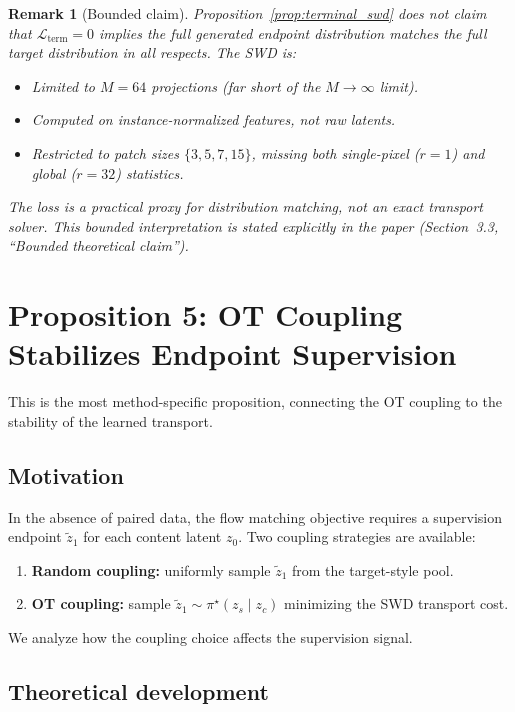 \documentclass[letterpaper]{article}
\newtheorem{remark}[proposition]{Remark}
\newcommand{\cL}{\mathcal{L}}
\begin{document}
\begin{remark}[Bounded claim]
Proposition~\ref{prop:terminal_swd} does not claim that $\cL_{\text{term}}=0$
implies the full generated endpoint distribution matches the full target
distribution in all respects. The SWD is:
\begin{itemize}
    \item Limited to $M = 64$ projections (far short of the $M\to\infty$ limit).
    \item Computed on instance-normalized features, not raw latents.
    \item Restricted to patch sizes $\{3,5,7,15\}$, missing both
    single-pixel ($r=1$) and global ($r=32$) statistics.
\end{itemize}
The loss is a \emph{practical proxy} for distribution matching, not an
exact transport solver. This bounded interpretation is stated explicitly
in the paper (Section~3.3, ``Bounded theoretical claim'').
\end{remark}


\section{Proposition 5: OT Coupling Stabilizes Endpoint Supervision}

This is the most method-specific proposition, connecting the OT coupling
to the stability of the learned transport.

\subsection{Motivation}

In the absence of paired data, the flow matching objective requires a
supervision endpoint $\tilde z_1$ for each content latent $z_0$.
Two coupling strategies are available:
\begin{enumerate}[nosep]
    \item \textbf{Random coupling:} uniformly sample $\tilde z_1$ from
    the target-style pool.
    \item \textbf{OT coupling:} sample $\tilde z_1 \sim \pi^\star(z_s \mid z_c)$
    minimizing the SWD transport cost.
\end{enumerate}
We analyze how the coupling choice affects the supervision signal.

\subsection{Theoretical development}
\end{document}
